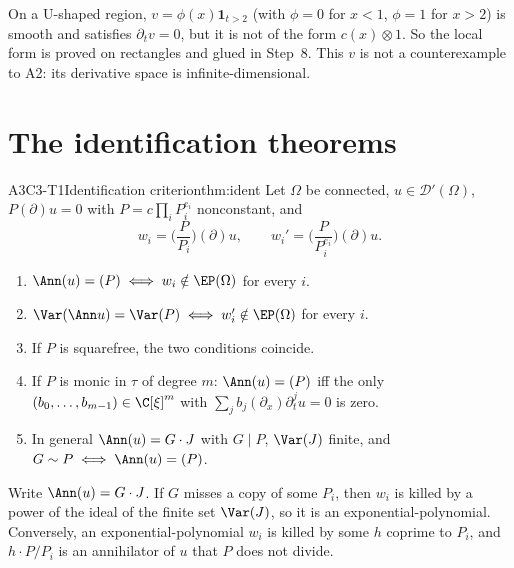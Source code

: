 \begin{caution}[title={Why rectangles in Step~6}]
On a U-shaped region, $v=\phi(x)\mathbf 1_{t>2}$ (with $\phi=0$ for $x<1$, $\phi=1$ for $x>2$) is smooth and satisfies $\partial_tv=0$, but it is not of the form $c(x)\otimes1$. So the local form is proved on rectangles and glued in Step~8. This $v$ is not a counterexample to A2: its derivative space is infinite-dimensional.
\end{caution}

\section{The identification theorems}

\begin{dimcard}{A3}{C3-T1}{Identification criterion}{\proved}{thm:ident}
Let $\Omega$ be connected, $u\in\mathcal D'(\Omega)$, $P(\partial)u=0$ with $P=c\prod_iP_i^{e_i}$ nonconstant, and
\[
w_i=\Big(\frac{P}{P_i}\Big)(\partial)u,\qquad w_i'=\Big(\frac{P}{P_i^{e_i}}\Big)(\partial)u .
\]
\begin{enumerate}[label=(\alph*)]
\item $\Ann(u)=(P)\iff w_i\notin\EP(\Omega)$ for every $i$.
\item $\Var(\Ann u)=\Var(P)\iff w_i'\notin\EP(\Omega)$ for every $i$.
\item If $P$ is squarefree, the two conditions coincide.
\item If $P$ is monic in $\tau$ of degree $m$: $\Ann(u)=(P)$ iff the only $(b_0,\dots,b_{m-1})\in\C[\xi]^m$ with $\sum_jb_j(\partial_x)\partial_t^ju=0$ is zero.
\item In general $\Ann(u)=G\cdot J$ with $G\mid P$, $\Var(J)$ finite, and $G\sim P\iff\Ann(u)=(P)$.
\end{enumerate}
\end{dimcard}

\begin{proofidea}
Write $\Ann(u)=G\cdot J$. If $G$ misses a copy of some $P_i$, then $w_i$ is killed by a power of the ideal of the finite set $\Var(J)$, so it is an exponential-polynomial. Conversely, an exponential-polynomial $w_i$ is killed by some $h$ coprime to $P_i$, and $h\cdot P/P_i$ is an annihilator of $u$ that $P$ does not divide.
\end{proofidea}

